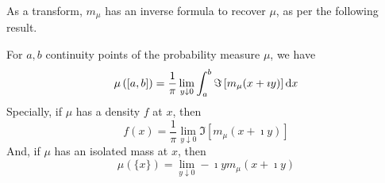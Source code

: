 As a transform, $m_{\mu}$ has an inverse formula to recover $\mu$, as per the following result.

\begin{theorem} \label{thm:inverse-stieltjes-transform}
	For $a,b$ continuity points of the probability measure $\mu$, we have
	\begin{equation}
		\mu\left([a,b]\right)=\frac{1}{\pi}\lim_{y\downarrow 0}\int_{a}^{b}\Im\left[m_{\mu}(x+\imath y)\right]\mathop{}\!\mathrm{d} x
	\end{equation}
	Specially, if $\mu$ has a density $f$ at $x$, then
	\begin{equation}
		f(x)=\frac{1}{\pi}\lim_{y\downarrow 0}\Im\left[m_{\mu}(x+\imath y)\right]
	\end{equation}
	And, if $\mu$ has an isolated mass at $x$, then
	\begin{equation}
		\mu(\{x\})=\lim_{y \downarrow 0}-\imath y m_{\mu}(x+\imath y)
	\end{equation}
\end{theorem}

